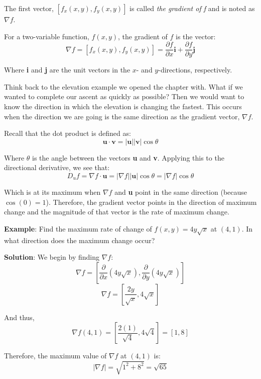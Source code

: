 The first vector, $\left[ f_x(x, y), f_y(x, y) \right]$ is called \textit{the 
gradient of f} and is noted as $\nabla f$. 

\begin{mdframed}[style = important, frametitle = {The Gradient}]
For a two-variable function, $f(x, y)$, the gradient of $f$ is the vector:
$$\nabla f = \left[ f_x(x, y), f_y(x, y) \right] = \frac{\partial f}{\partial 
x} \textbf{i} + \frac{\partial f}{\partial y} \textbf{j}$$

Where \textbf{i} and \textbf{j} are the unit vectors in the $x$- and 
$y$-directions, respectively.
\end{mdframed}

Think back to the elevation example we opened the chapter with. What if we 
wanted to complete our ascent as quickly as possible? Then we would want to 
know the direction in which the elevation is changing the fastest. This occurs 
when the direction we are going is the same direction as the gradient vector, 
$\nabla f$. 

Recall that the dot product is defined as:
$$\textbf{u} \cdot \textbf{v} = \left| \textbf{u} \right| \left| \textbf{v} 
\right| \cos{ \theta}$$

Where $\theta$ is the angle between the vectors \textbf{u} and \textbf{v}. 
Applying this to the directional derivative, we see that:
$$D_u f = \nabla f \cdot \textbf{u} = \left| \nabla f \right| \left| 
\textbf{u} \right| \cos{\theta} = \left| \nabla f \right| \cos{\theta}$$

Which is at its maximum when $\nabla f$ and \textbf{u} point in the same 
direction (because $\cos{\left( 0 \right)} = 1$). Therefore, the gradient 
vector points in the direction of maximum change and the magnitude of that 
vector is the rate of maximum change. 

\textbf{Example}: Find the maximum rate of change of $f(x, y) = 4y\sqrt{x}$ at 
$(4, 1)$. In what direction does the maximum change occur?

\textbf{Solution}: We begin by finding $\nabla f$:
$$\nabla f = \left[ \frac{\partial}{\partial x} \left( 4y\sqrt{x} \right), 
\frac{\partial}{\partial y} \left( 4y\sqrt{x} \right) \right]$$
$$\nabla f = \left[ \frac{2y}{\sqrt{x}}, 4\sqrt{x} \right]$$

And thus, 
$$\nabla f(4, 1) = \left[ \frac{2(1)}{\sqrt{4}}, 4\sqrt{4} \right] = \left[ 1, 
8 \right]$$

Therefore, the maximum value of $\nabla f$ at $(4, 1)$ is:
$$\left| \nabla f \right| = \sqrt{1^2 + 8^2} = \sqrt{65}$$

